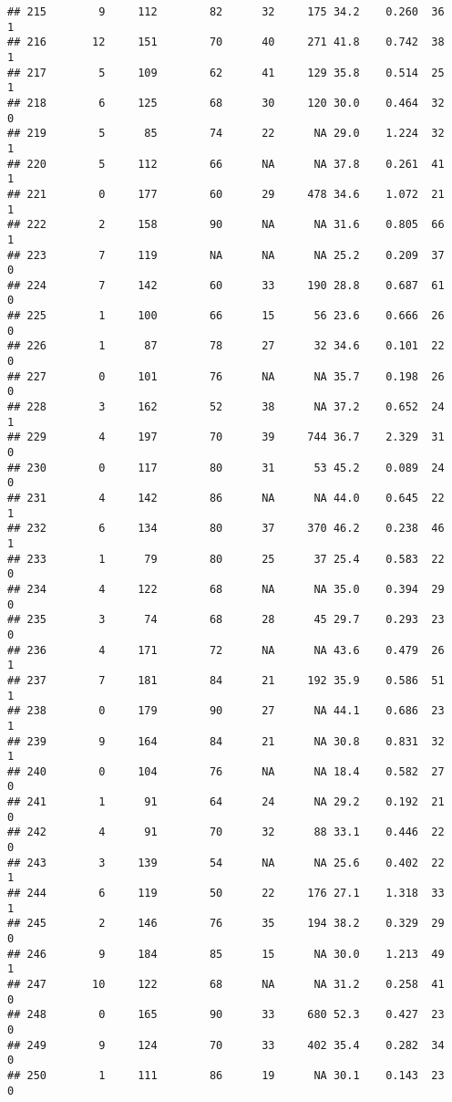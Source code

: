 \documentclass[
]{article}
\begin{document}
\begin{verbatim}
## 215        9     112        82      32     175 34.2    0.260  36    1
## 216       12     151        70      40     271 41.8    0.742  38    1
## 217        5     109        62      41     129 35.8    0.514  25    1
## 218        6     125        68      30     120 30.0    0.464  32    0
## 219        5      85        74      22      NA 29.0    1.224  32    1
## 220        5     112        66      NA      NA 37.8    0.261  41    1
## 221        0     177        60      29     478 34.6    1.072  21    1
## 222        2     158        90      NA      NA 31.6    0.805  66    1
## 223        7     119        NA      NA      NA 25.2    0.209  37    0
## 224        7     142        60      33     190 28.8    0.687  61    0
## 225        1     100        66      15      56 23.6    0.666  26    0
## 226        1      87        78      27      32 34.6    0.101  22    0
## 227        0     101        76      NA      NA 35.7    0.198  26    0
## 228        3     162        52      38      NA 37.2    0.652  24    1
## 229        4     197        70      39     744 36.7    2.329  31    0
## 230        0     117        80      31      53 45.2    0.089  24    0
## 231        4     142        86      NA      NA 44.0    0.645  22    1
## 232        6     134        80      37     370 46.2    0.238  46    1
## 233        1      79        80      25      37 25.4    0.583  22    0
## 234        4     122        68      NA      NA 35.0    0.394  29    0
## 235        3      74        68      28      45 29.7    0.293  23    0
## 236        4     171        72      NA      NA 43.6    0.479  26    1
## 237        7     181        84      21     192 35.9    0.586  51    1
## 238        0     179        90      27      NA 44.1    0.686  23    1
## 239        9     164        84      21      NA 30.8    0.831  32    1
## 240        0     104        76      NA      NA 18.4    0.582  27    0
## 241        1      91        64      24      NA 29.2    0.192  21    0
## 242        4      91        70      32      88 33.1    0.446  22    0
## 243        3     139        54      NA      NA 25.6    0.402  22    1
## 244        6     119        50      22     176 27.1    1.318  33    1
## 245        2     146        76      35     194 38.2    0.329  29    0
## 246        9     184        85      15      NA 30.0    1.213  49    1
## 247       10     122        68      NA      NA 31.2    0.258  41    0
## 248        0     165        90      33     680 52.3    0.427  23    0
## 249        9     124        70      33     402 35.4    0.282  34    0
## 250        1     111        86      19      NA 30.1    0.143  23    0

\end{verbatim}
\end{document}
